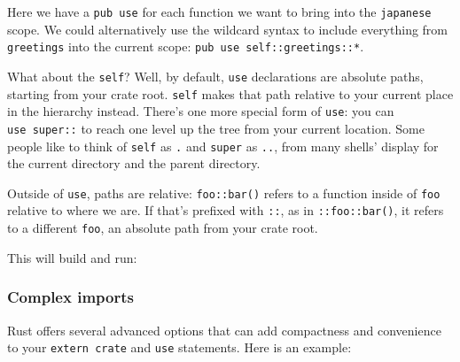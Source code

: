 \documentclass[a4paper,]{book}
\newenvironment{Shaded}{\begin{snugshade}}{\end{snugshade}}
\newcommand{\KeywordTok}[1]{\textcolor[rgb]{0.13,0.29,0.53}{\textbf{{#1}}}}
\newcommand{\NormalTok}[1]{{#1}}
\begin{document}
Here we have a \texttt{pub\ use} for each function we want to bring into
the \texttt{japanese} scope. We could alternatively use the wildcard
syntax to include everything from \texttt{greetings} into the current
scope: \texttt{pub\ use\ self::greetings::*}.

What about the \texttt{self}? Well, by default, \texttt{use}
declarations are absolute paths, starting from your crate root.
\texttt{self} makes that path relative to your current place in the
hierarchy instead. There's one more special form of \texttt{use}: you
can \texttt{use\ super::} to reach one level up the tree from your
current location. Some people like to think of \texttt{self} as
\texttt{.} and \texttt{super} as \texttt{..}, from many shells' display
for the current directory and the parent directory.

Outside of \texttt{use}, paths are relative: \texttt{foo::bar()} refers
to a function inside of \texttt{foo} relative to where we are. If that's
prefixed with \texttt{::}, as in \texttt{::foo::bar()}, it refers to a
different \texttt{foo}, an absolute path from your crate root.

This will build and run:

\begin{Shaded}
\end{Shaded}

\subsubsection{Complex imports}\label{complex-imports}

Rust offers several advanced options that can add compactness and
convenience to your \texttt{extern\ crate} and \texttt{use} statements.
Here is an example:
\end{document}
